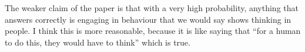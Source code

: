 \documentclass[
10pt, %
a4paper, %
oneside, %
headinclude,footinclude, %
BCOR5mm, %
]{scrartcl}
\begin{document}
The weaker claim of the paper is that with a very high probability, anything that answers correctly is engaging in behaviour that we would say shows thinking in people. I think this is more reasonable, because it is like saying that ``for a human to do this, they would have to think'' which is true.


\renewcommand{\refname}{\spacedlowsmallcaps{References}} %




\end{document}
